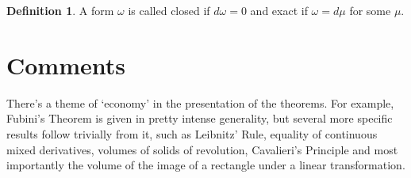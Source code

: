 \documentclass[20pt]{article}
\theoremstyle{plain}
\theoremstyle{definition}
\newtheorem{definition}{Definition}
\begin{document}
\begin{definition}
  A form $\omega$ is called closed if $d\omega = 0$ and exact if $\omega = d\mu$ for some $\mu. $
\end{definition} 




 







































\section{Comments}

There's a theme of `economy' in the presentation of the theorems.
For example, Fubini's Theorem is given in pretty intense generality, 
but several more specific results follow trivially from it, 
such as Leibnitz' Rule, equality of continuous mixed derivatives,
volumes of solids of revolution, Cavalieri's Principle and most importantly 
the volume of the image of a rectangle under a linear transformation.
\end{document}
